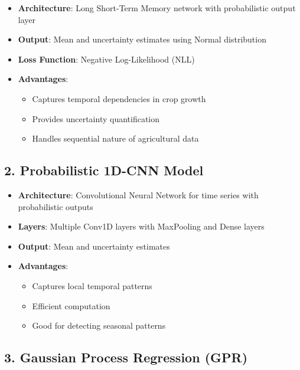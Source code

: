 \documentclass[
  letterpaper,
  DIV=11,
  numbers=noendperiod]{scrreprt}
\providecommand{\tightlist}{%
  \setlength{\itemsep}{0pt}\setlength{\parskip}{0pt}}\usepackage{longtable,booktabs,array}
\begin{document}
\begin{itemize}
\tightlist
\item
  \textbf{Architecture}: Long Short-Term Memory network with
  probabilistic output layer
\item
  \textbf{Output}: Mean and uncertainty estimates using Normal
  distribution
\item
  \textbf{Loss Function}: Negative Log-Likelihood (NLL)
\item
  \textbf{Advantages}:

  \begin{itemize}
  \tightlist
  \item
    Captures temporal dependencies in crop growth
  \item
    Provides uncertainty quantification
  \item
    Handles sequential nature of agricultural data
  \end{itemize}
\end{itemize}

\subsection{2. Probabilistic 1D-CNN
Model}\label{probabilistic-1d-cnn-model}

\begin{itemize}
\tightlist
\item
  \textbf{Architecture}: Convolutional Neural Network for time series
  with probabilistic outputs
\item
  \textbf{Layers}: Multiple Conv1D layers with MaxPooling and Dense
  layers
\item
  \textbf{Output}: Mean and uncertainty estimates
\item
  \textbf{Advantages}:

  \begin{itemize}
  \tightlist
  \item
    Captures local temporal patterns
  \item
    Efficient computation
  \item
    Good for detecting seasonal patterns
  \end{itemize}
\end{itemize}

\subsection{3. Gaussian Process Regression
(GPR)}\label{gaussian-process-regression-gpr}
\end{document}
